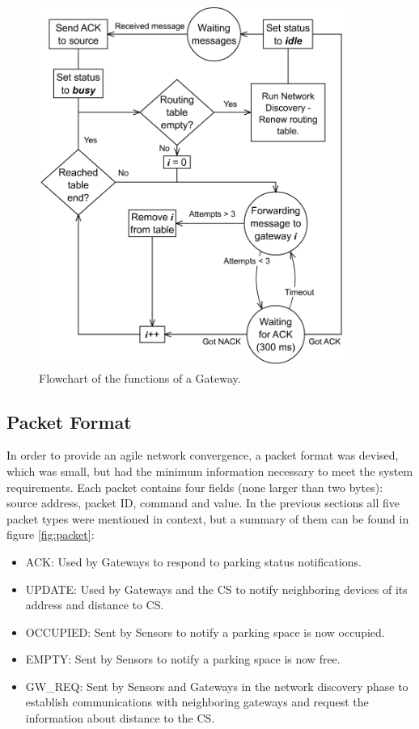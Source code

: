 \begin{figure}
    \centering
    \includegraphics[width=10cm]{images/Flowchart_Gateway.png}
	\vspace{-1.5em}
    \caption{Flowchart of the functions of a Gateway.}
    \vspace{-1.5em}
    \label{fig:gateway}
\end{figure}

\subsection{Packet Format}
\label{sec:packet_format}
In order to provide an agile network convergence, a packet format was devised, which was small, but had the minimum information necessary to meet the system requirements.
Each packet contains four fields (none larger than two bytes): source address, packet ID, command and value.
In the previous sections all five packet types were mentioned in context, but a summary of them can be found in figure \ref{fig:packet}:
\begin{itemize}[noitemsep]
	\item ACK: Used by Gateways to respond to parking status notifications. 
	\item UPDATE: Used by Gateways and the CS to notify neighboring devices of its address and distance to CS.
	\item OCCUPIED: Sent by Sensors to notify a parking space is now occupied.
	\item EMPTY: Sent by Sensors to notify a parking space is now free.
	\item GW\_REQ: Sent by Sensors and Gateways in the network discovery phase to establish communications with neighboring gateways and request the information about distance to the CS.
\end{itemize}


